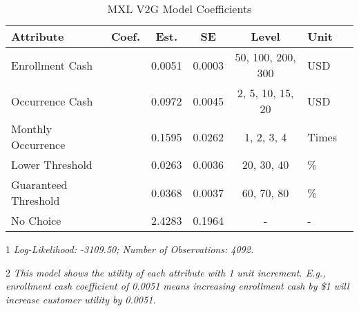\begin{table}[H]
\centering
\begin{threeparttable}
\caption{MXL V2G Model Coefficients}
\fontsize{11}{12}\selectfont
\begin{tabular}{l>{\centering\arraybackslash}p{1.5cm}ccc>{\centering\arraybackslash}p{2cm}c}
\toprule
\textbf{Attribute} & \textbf{Coef.} & \textbf{Est.} & \textbf{SE} & \textbf{Level} & \textbf{Unit}\\
\midrule
\multirow{-1}{*}{\raggedright\arraybackslash Enrollment Cash} & \multirow{-1}{1.5cm}{\centering\arraybackslash $\beta_1$} & 0.0051 & 0.0003 & 50, 100, 200, 300 & USD\\
\cmidrule(lr){1-6}
\multirow{-1}{*}{\raggedright\arraybackslash Occurrence Cash} & \multirow{-1}{1.5cm}{\centering\arraybackslash $\beta_2$} & 0.0972 & 0.0045 & 2, 5, 10, 15, 20 & USD\\
\cmidrule(lr){1-6}
\multirow{-1}{*}{\raggedright\arraybackslash Monthly Occurrence} & \multirow{-1}{1.5cm}{\centering\arraybackslash $\beta_3$} & 0.1595 & 0.0262 & 1, 2, 3, 4 & Times\\
\cmidrule(lr){1-6}
\multirow{-1}{*}{\raggedright\arraybackslash Lower Threshold} & \multirow{-1}{1.5cm}{\centering\arraybackslash $\beta_4$} & 0.0263 & 0.0036 & 20, 30, 40 & \%\\
\cmidrule(lr){1-6}
\multirow{-1}{*}{\raggedright\arraybackslash Guaranteed Threshold} & \multirow{-1}{1.5cm}{\centering\arraybackslash $\beta_5$} & 0.0368 & 0.0037 & 60, 70, 80 & \%\\
\cmidrule(lr){1-6}
\multirow{-1}{*}{\raggedright\arraybackslash No Choice} & \multirow{-1}{1.5cm}{\centering\arraybackslash $\beta_6$} & 2.4283 & 0.1964 & - & -\\
\bottomrule
\end{tabular}
\begin{tablenotes}
\small
\item [1] \textit{Log-Likelihood: -3109.50; Number of Observations: 4092.}
\item [2] \textit{This model shows the utility of each attribute with 1 unit increment. E.g., enrollment cash coefficient of 0.0051 means increasing enrollment cash by \$1 will increase customer utility by 0.0051.}
\end{tablenotes}
\label{table_mxl_model_v2g}
\end{threeparttable}
\end{table}
